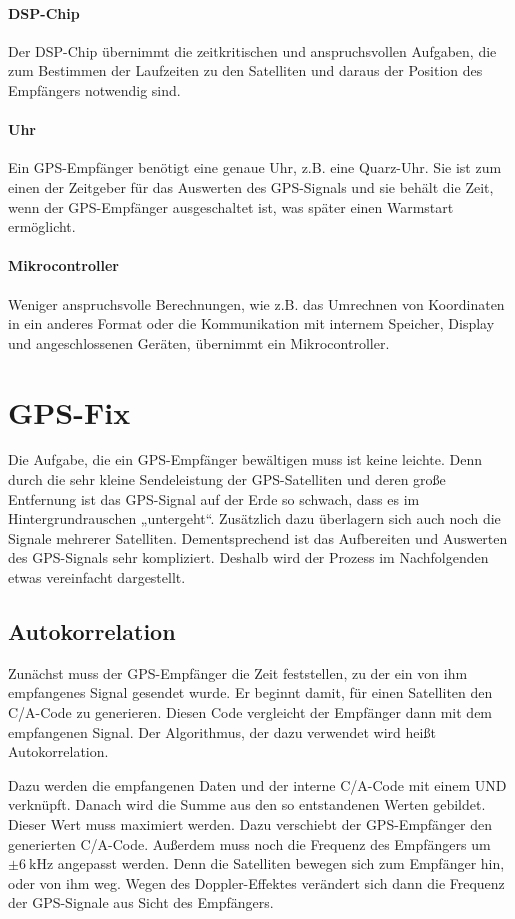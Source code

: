 \documentclass[12pt,a4paper]{scrartcl}
\begin{document}
\paragraph{DSP-Chip}
Der DSP-Chip übernimmt die zeitkritischen und anspruchsvollen Aufgaben, die zum Bestimmen der Laufzeiten zu den Satelliten und daraus der Position des Empfängers notwendig sind.

\paragraph{Uhr}
Ein GPS-Empfänger benötigt eine genaue Uhr, z.B. eine Quarz-Uhr. Sie ist zum einen der Zeitgeber für das Auswerten des GPS-Signals und sie behält die Zeit, wenn der GPS-Empfänger ausgeschaltet ist, was später einen Warmstart ermöglicht.

\paragraph{Mikrocontroller}
Weniger anspruchsvolle Berechnungen, wie z.B. das Umrechnen von Koordinaten in ein anderes Format oder die Kommunikation mit internem Speicher, Display und angeschlossenen Geräten, übernimmt ein Mikrocontroller.

\section{GPS-Fix}
Die Aufgabe, die ein GPS-Empfänger bewältigen muss ist keine leichte.
Denn durch die sehr kleine Sendeleistung der GPS-Satelliten und deren große Entfernung ist das GPS-Signal auf der Erde so schwach, dass es im Hintergrundrauschen „untergeht“. Zusätzlich dazu überlagern sich auch noch die Signale mehrerer Satelliten. Dementsprechend ist das Aufbereiten und Auswerten des GPS-Signals sehr kompliziert. Deshalb wird der Prozess im Nachfolgenden etwas vereinfacht dargestellt.

\subsection{Autokorrelation}
\label{sec:correlation}
Zunächst muss der GPS-Empfänger die Zeit feststellen, zu der ein von ihm empfangenes Signal gesendet wurde. Er beginnt damit, für einen Satelliten den C/A-Code zu generieren. Diesen Code vergleicht der Empfänger dann mit dem empfangenen Signal. Der Algorithmus, der dazu verwendet wird heißt Autokorrelation.

Dazu werden die empfangenen Daten und der interne C/A-Code mit einem UND verknüpft. Danach wird die Summe aus den so entstandenen Werten gebildet. Dieser Wert muss maximiert werden. Dazu verschiebt der GPS-Empfänger den generierten C/A-Code. Außerdem muss noch die Frequenz des Empfängers um $\pm \SI{6}{\kilo\hertz}$ angepasst werden. Denn die Satelliten bewegen sich zum Empfänger hin, oder von ihm weg. Wegen des Doppler-Effektes verändert sich dann die Frequenz der GPS-Signale aus Sicht des Empfängers.
\end{document}
